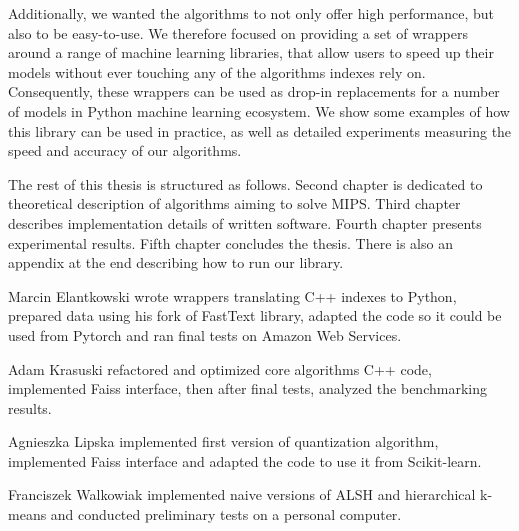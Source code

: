 Additionally, we wanted the algorithms to not only offer high performance, but also to be easy-to-use. We therefore
focused on providing a set of wrappers around a range of machine learning libraries, that allow users to 
speed up their models without ever touching any of the algorithms indexes rely on. Consequently,
these wrappers can be used as drop-in replacements for a number of models in Python machine learning ecosystem.
We show some examples of how this library can be used in practice,
as well as detailed experiments measuring the speed and accuracy of our algorithms.

The rest of this thesis is structured as follows.
Second chapter is dedicated to theoretical description of algorithms aiming to solve MIPS.
Third chapter describes implementation details of written software.
Fourth chapter presents experimental results.
Fifth chapter concludes the thesis.
There is also an appendix at the end describing how to run our library.

Marcin Elantkowski wrote wrappers translating C++ indexes to Python, prepared data using his fork of FastText
library, adapted the code so it could be used from Pytorch and ran final tests on Amazon Web Services.

Adam Krasuski refactored and optimized core algorithms C++ code, implemented Faiss interface,
then after final tests, analyzed the benchmarking results.

Agnieszka Lipska implemented first version of quantization algorithm, implemented Faiss interface and
adapted the code to use it from Scikit-learn.

Franciszek Walkowiak implemented naive versions of ALSH and hierarchical \mbox{k-means} and conducted 
preliminary tests on a personal computer.
\newpage

